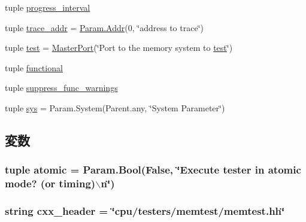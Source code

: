 \begin{DoxyCompactItemize}
\item 
tuple \hyperlink{classMemTest_1_1MemTest_a1446cbc3c813038b4583bfa7ee8cab43}{progress\_\-interval}
\item 
tuple \hyperlink{classMemTest_1_1MemTest_abca334d46518781adf3b577aaf49b2d5}{trace\_\-addr} = \hyperlink{base_2types_8hh_af1bb03d6a4ee096394a6749f0a169232}{Param.Addr}(0, \char`\"{}address to trace\char`\"{})
\item 
tuple \hyperlink{classMemTest_1_1MemTest_ae2be30e6b14c541b72cb62bdb6169fab}{test} = \hyperlink{classMasterPort}{MasterPort}(\char`\"{}Port to the memory system to \hyperlink{classMemTest_1_1MemTest_ae2be30e6b14c541b72cb62bdb6169fab}{test}\char`\"{})
\item 
tuple \hyperlink{classMemTest_1_1MemTest_ac90470b0f2da07edf9757a1a904579b8}{functional}
\item 
tuple \hyperlink{classMemTest_1_1MemTest_a557248044ce243b3a309dbc63e306990}{suppress\_\-func\_\-warnings}
\item 
tuple \hyperlink{classMemTest_1_1MemTest_a1f27497e90bf86cc0b513e5c086c9e19}{sys} = Param.System(Parent.any, \char`\"{}System Parameter\char`\"{})
\end{DoxyCompactItemize}


\subsection{変数}
\hypertarget{classMemTest_1_1MemTest_a3f21b1c4cb8442db410072b4c7d04f28}{
\subsubsection[{atomic}]{\setlength{\rightskip}{0pt plus 5cm}tuple {\bf atomic} = Param.Bool(False, \char`\"{}Execute tester in {\bf atomic} mode? (or timing)$\backslash$n\char`\"{})}}
\label{classMemTest_1_1MemTest_a3f21b1c4cb8442db410072b4c7d04f28}
\hypertarget{classMemTest_1_1MemTest_a17da7064bc5c518791f0c891eff05fda}{
\subsubsection[{cxx\_\-header}]{\setlength{\rightskip}{0pt plus 5cm}string {\bf cxx\_\-header} = \char`\"{}cpu/testers/memtest/memtest.hh\char`\"{}}}
\label{classMemTest_1_1MemTest_a17da7064bc5c518791f0c891eff05fda}


